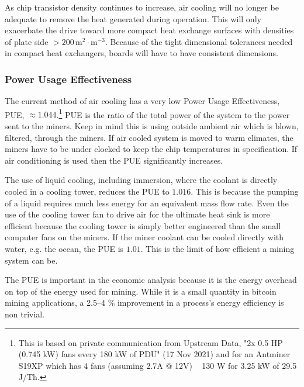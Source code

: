 \documentclass[runningheads]{llncs}
\begin{document}
As chip transistor density continues to increase, air cooling will no longer be adequate to remove the heat generated during operation.
This will only exacerbate the drive toward more compact heat exchange surfaces with densities of plate side $>200\,\textrm{m}^2\cdot\textrm{m}^{-3}$.
Because of the tight dimensional tolerances needed in compact heat exchangers, boards will have to have consistent dimensions.

\subsubsection{Power Usage Effectiveness}
The current method of air cooling has a very low Power Usage Effectiveness, PUE, $\approx 1.044$.\footnote{
    This is based on private communication from Upstream Data, "2x 0.5 HP (0.745 kW) fans every 180 kW of PDU" (17 Nov 2021) and for an Antminer S19XP  which has 4 fans (assuming 2.7A @ 12V) ~ 130 W for 3.25 kW of 29.5 J/Th.}
PUE is the ratio of the total power of the system to the power sent to the miners.
Keep in mind this is using outside ambient air which is blown, filtered, through the miners.
If air cooled system is moved to warm climates, the miners have to be under clocked to keep the chip temperatures in specification.
If air conditioning is used then the PUE significantly increases.

The use of liquid cooling, including immersion, where the coolant is directly cooled in a cooling tower, reduces the PUE to $1.016$.
This is because the pumping of a liquid requires much less energy for an equivalent mass flow rate.
Even the use of the cooling tower fan to drive air for the ultimate heat sink is more efficient because the cooling tower is simply better engineered than the small computer fans on the miners.
If the miner coolant can be cooled directly with water, e.g. the ocean, the PUE is $1.01$.
This is the limit of how efficient a mining system can be.

The PUE is important in the economic analysis because it is the energy overhead on top of the energy used for mining.
While it is a small quantity in bitcoin mining applications, a 2.5--4 \% improvement in a process's energy efficiency is non trivial.

\end{document}
